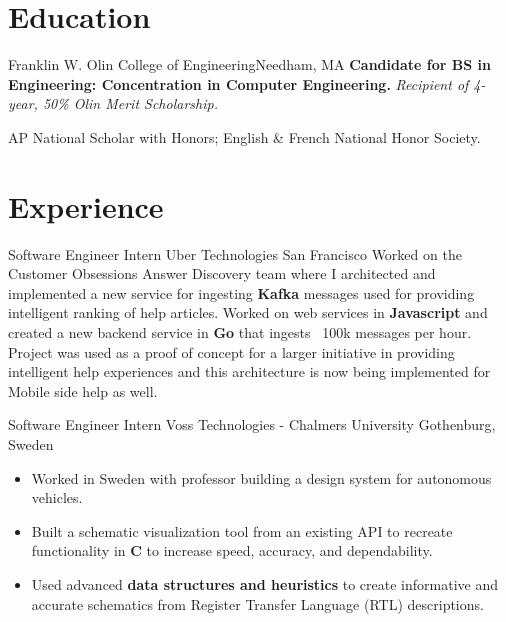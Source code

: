\documentclass[11 pt]{moderncv}
\begin{document}
\maketitle

\vspace{-.2in}

\section{Education}

{Franklin W. Olin College of Engineering}{}{Needham, MA}{}
{
	\textbf{Candidate for BS in Engineering: Concentration in Computer Engineering.}
	\newline
	\textit{Recipient of 4-year, 50\% Olin Merit Scholarship.}
}

{
	AP National Scholar with Honors; English \& French National Honor Society.
	\begin{flushright}
	\vspace {-0.3 in}
	\end{flushright}
	\vspace {-0.1 in}
}

\section{Experience}
\vspace{0.1 in}

{Software Engineer Intern}
{Uber Technologies}
{San Francisco}
{}
{
Worked on the Customer Obsessions Answer Discovery team where I architected and implemented a new service for ingesting \textbf{Kafka} messages used for providing 
intelligent ranking of help articles. Worked on web services in \textbf{Javascript} and created a new backend service in \textbf{Go} that ingests ~100k messages 
per hour. Project was used as a proof of concept for a larger initiative in providing intelligent help experiences and this architecture is now being 
implemented for Mobile side help as well.
}

{Software Engineer Intern}
{Voss Technologies - Chalmers University}
{Gothenburg, Sweden}
{}
{
\begin{itemize}
	\item Worked in Sweden with professor building a design system for autonomous vehicles.
	\item Built a schematic visualization tool from an existing API to recreate functionality in \textbf{C} to increase speed, accuracy, and dependability. 
	\item Used advanced \textbf{data structures and heuristics} to create informative and accurate schematics from Register Transfer Language (RTL) descriptions.
\end{itemize}
}
\end{document}
